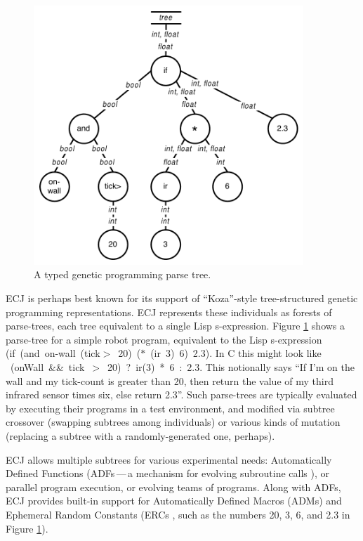 \documentclass[twoside,10pt]{book}
\newcommand\lisp[1]{\textsf{#1}}
\begin{document}
\begin{figure}[t]
\begin{center}
\includegraphics[width=4in]{parsetree.pdf}
\end{center}
\caption{A typed genetic programming parse tree.}
\label{parsetree}
\end{figure}


ECJ is perhaps best known for its support of ``Koza''-style tree-structured genetic programming representations.  ECJ represents these individuals as forests of parse-trees, each tree equivalent to a single Lisp s-expression.  Figure \ref{parsetree} shows a parse-tree for a simple robot program, equivalent to the Lisp s-expression \mbox{\lisp{(if (and on-wall (tick\(>\) 20) (\(\ast\) (ir 3) 6) 2.3).}}  In C this might look like \mbox{\lisp{ (onWall \&\& tick \(>\) 20) ? ir(3) * 6 : 2.3}.}  This notionally says ``If I'm on the wall and my tick-count is greater than 20, then return the value of my third infrared sensor times six, else return 2.3''.  Such parse-trees are typically evaluated by executing their programs in a test environment, and modified via subtree crossover (swapping subtrees among individuals) or various kinds of mutation (replacing a subtree with a randomly-generated one, perhaps).  

ECJ allows multiple subtrees for various experimental needs: Automatically Defined Functions (ADFs\,---\,a mechanism for evolving subroutine calls \cite{koza:gp2}), or parallel program execution, or evolving teams of programs.  Along with ADFs, ECJ provides built-in support for Automatically Defined Macros (ADMs) \cite{adm} and Ephemeral Random Constants (ERCs \cite{koza:book}, such as the numbers 20, 3, 6, and 2.3 in Figure \ref{parsetree}).
\end{document}

